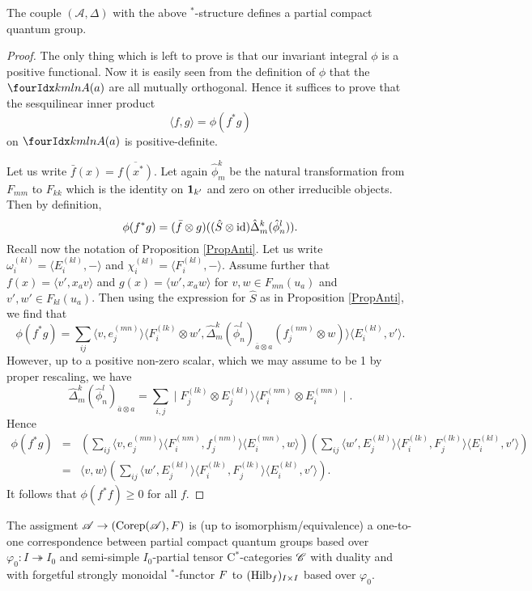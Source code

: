 \begin{Prop} The couple $(\mathscr{A},\Delta)$ with the above $^*$-structure defines a partial compact quantum group.
\end{Prop}
\begin{proof} The only thing which is left to prove is that our invariant integral $\phi$ is a positive functional. Now it is easily seen from the definition of $\phi$ that the $\Gr{A}{k}{l}{m}{n}(a)$ are all mutually orthogonal. Hence it suffices to prove that the sesquilinear inner product \[\langle f,g\rangle = \phi(f^*g)\] on $\Gr{A}{k}{l}{m}{n}(a)$ is positive-definite. 

Let us write $\bar{f}(x) = \overline{f(x^*)}$. Let again $\hat{\phi}^k_m$ be the natural transformation from $F_{mm}$ to $F_{kk}$ which is the identity on $\mathbf{1}_{k'}$ and zero on other irreducible objects. Then by definition, \[\phi(f^*g) = (\bar{f}\otimes g)((\hat{S}\otimes \operatorname{id})\hat{\Delta}^k_m(\hat{\phi}^l_n)).\] Recall now the notation of Proposition \ref{PropAnti}. Let us write $\omega_i^{(kl)} = \langle E_i^{(kl)},-\rangle$ and $\chi_i^{(kl)} = \langle F_i^{(kl)},-\rangle$. Assume further that $f(x) = \langle v',x_a v\rangle$ and $g(x) = \langle w',x_aw\rangle$ for $v,w\in F_{mn}(u_a)$ and $v',w'\in F_{kl}(u_a)$. Then using the expression for $\hat{S}$ as in Proposition \ref{PropAnti}, we find that \[\phi(f^*g) = \sum_{ij} \langle v,e_j^{(mn)}\rangle\langle F_i^{(lk)}\otimes w',\hat{\Delta}_m^k(\hat{\phi}^{l}_n)_{\bar{a}\otimes a} (f_j^{(nm)}\otimes w)\rangle \langle E_i^{(kl)}, v'\rangle .\] However, up to a positive non-zero scalar, which we may assume to be 1 by proper rescaling, we have \[\hat{\Delta}^k_m(\hat{\phi}^l_n)_{\bar{a}\otimes a} = \sum_{i,j} \mid F_j^{(lk)} \otimes E_j^{(kl)}\rangle \langle F_i^{(nm)}\otimes E_i^{(mn)}\mid.\] Hence \begin{eqnarray*} \phi(f^*g) &=&\left(\sum_{ij}\langle v,e_j^{(mn)}\rangle \langle F_i^{(nm)},f_j^{(nm)}\rangle\langle E_i^{(mn)},w\rangle \right)  \left(\sum_{ij}  \langle w',E_j^{(kl)}\rangle \langle F_i^{(lk)},F_j^{(lk)}\rangle\langle E_i^{(kl)},v'\rangle\right)\\ &=& \langle v,w\rangle  \left(\sum_{ij}  \langle w',E_j^{(kl)}\rangle \langle F_i^{(lk)},F_j^{(lk)}\rangle\langle E_i^{(kl)},v'\rangle\right).
\end{eqnarray*} It follows that $\phi(f^*f)\geq 0$ for all $f$.

\end{proof} 

\begin{Theorem} \label{TheoTKPCQG}

The assigment $\mathscr{A}\rightarrow (\mathrm{Corep}(\mathscr{A}),F)$ is (up to isomorphism/equivalence) a one-to-one correspondence between partial compact quantum groups based over $\varphi_0:I\twoheadrightarrow I_0$ and semi-simple $I_0$-partial tensor C$^*$-categories $\mathscr{C}$ with duality and with forgetful strongly monoidal $^*$-functor $F$ to $(\mathrm{Hilb}_f)_{I\times I}$ based over $\varphi_0$. 
\end{Theorem} 

